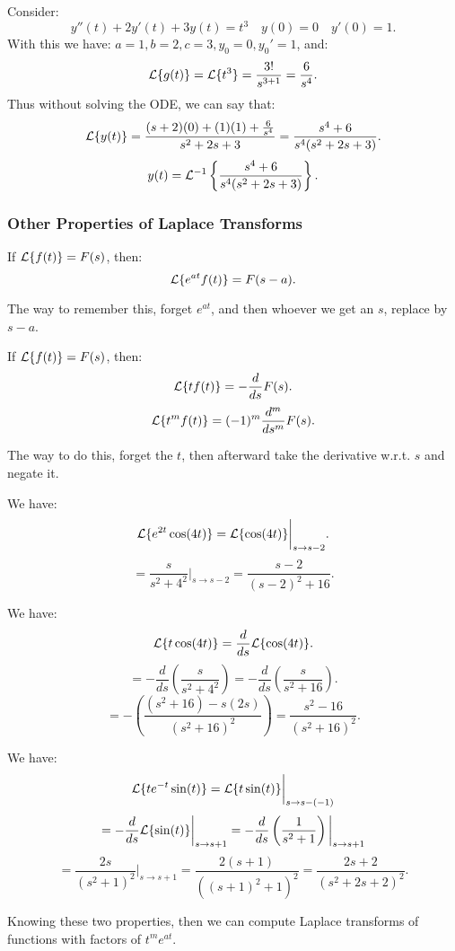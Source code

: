 \documentclass[../main/main.tex]{subfiles}
\begin{document}
\begin{example}
	Consider: \[
		y''(t) + 2y'(t) + 3y(t) = t^3\quad y(0) = 0 \quad y'(0) = 1
	.\] With this we have: $a=1,b=2,c=3,y_0=0,y_0'=1$, and: \[
	\mathcal{L} \{g(t)\} =\mathcal{L} \{t ^{3} \} = \frac{3!}{s^{3+1}} = \frac{6}{s^{4}}
	.\] Thus without solving the ODE, we can say that: \[
	\mathcal{L} \{y(t) \} = \frac{(s+2)(0)+(1)(1)+\frac{6}{s^{4}}}{s^2+2s+3} = \frac{s^{4}+6}{s^{4}(s^2+2s+3)}
	.\] \[
	y(t) = \mathcal{L} ^{-1}\left\{ \frac{s^{4}+6}{s^{4}(s^2+2s+3)}\right\}
	.\] 
\end{example}
\subsubsection{Other Properties of Laplace Transforms}
\begin{theorem}
	If $\mathcal{L} \{f(t)\} =F(s)$, then: \[
		\mathcal{L} \{e^{at}f(t)\} =F(s-a)
	.\] 
\end{theorem}
\begin{remark}
	The way to remember this, forget $e^{a t}$, and then whoever we get an $s$, replace by $s-a$.
\end{remark}
\begin{theorem}
	If $\mathcal{L} \{f(t)\} =F(s)$, then: \[
		\mathcal{L} \{tf(t)\} = - \frac{d}{ds}F(s)
	.\] \[
	\mathcal{L} \{t ^{m}f(t)\} = (-1)^{m} \frac{d^{m}}{ds^{m}}F(s)
	.\] 
	\end{theorem}
	\begin{remark}
		The way to do this, forget the $t$, then afterward take the derivative w.r.t. $s$ and negate it.
	\end{remark}
\begin{example}
	We have: \[
		\mathcal{L} \{e^{2t}\cos(4t)\} =\mathcal{L} \{\cos(4t)\} \bigg\rvert_{s\to s-2}
	.\] \[
=\frac{s}{s^2+4^2}\bigg\rvert_{s\to s-2} = \frac{s-2}{(s-2)^{2}+16}
	.\] 
\end{example}
\begin{example}
We have: \[
	\mathcal{L} \{t \cos(4t)\}  = \frac{d}{ds}\mathcal{L} \{\cos (4t)\} 
.\] 	\[
=-\frac{d}{ds}\left( \frac{s}{s^2+4^2} \right) =-\frac{d}{ds}\left( \frac{s}{s^2+16} \right) 
.\] \[
=-\left( \frac{\left( s^2+16 \right)-s(2s) }{\left( s^2+16 \right) ^2} \right) =\frac{s^2-16}{(s^2+16)^2}
.\] 
\end{example}
\begin{example}
We have: \[
\mathcal{L} \{t e^{-t}\sin(t)\} =\mathcal{L} \{t \sin(t)\} \bigg\rvert_{s\to s-(-1)}
\] 	\[
=-\frac{d}{ds}\mathcal{L} \{\sin(t)\} \bigg\rvert_{s\to s+1}= - \frac{d}{ds}\left( \frac{1}{s^2+1} \right) \bigg\rvert_{s\to s+1}
\] \[
=\frac{2s}{(s^2+1)^2}\bigg\vert_{s\to s+1}= \frac{2(s+1)}{\left( (s+1)^2+1 \right) ^2}= \frac{2s+2}{\left( s^2+2s+2 \right) ^2}
.\] 
\end{example}
\begin{remark}
	Knowing these two properties, then we can compute Laplace transforms of functions with factors of $t ^{m}e^{at}$.
\end{remark}
\end{document}
